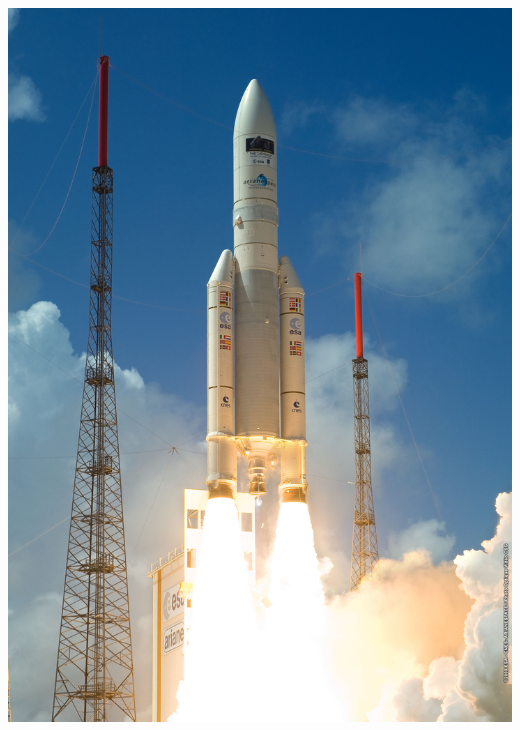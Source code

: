 \documentclass[sans, aspectratio=169]{beamer}
\begin{document}
\begin{frame}
\begin{columns}
		\begin{column}{0.3\linewidth}
			\begin{flushright}
			\includegraphics[scale=0.2]{images/arian5.jpg} 
			\end{flushright}
			
		\end{column}
		
	\end{columns}
	
\end{frame}
\end{document}
